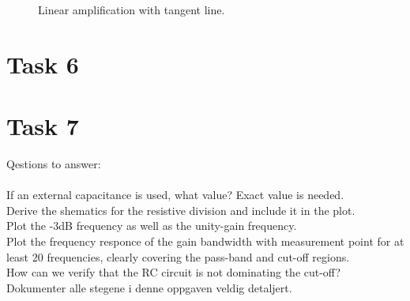 \documentclass[a4paper,english,11pt]{article}
\begin{document}
\begin{figure}[htbp]
 \centering
  \caption{Linear amplification with tangent line.}
  \label{fig:lin-amp-tan}	
\end{figure}

\section{Task 6}

\section{Task 7}
Qestions to answer:\\
\\
If an external capacitance is used, what value? Exact value is needed.\\
Derive the shematics for the resistive division and include it in the plot.\\
Plot the -3dB frequency as well as the unity-gain frequency.\\
Plot the frequency responce of the gain bandwidth with measurement point for at least 20 frequencies, clearly covering the pass-band and cut-off regions.\\
How can we verify that the RC circuit is not dominating the cut-off?\\
Dokumenter alle stegene i denne oppgaven veldig detaljert.\\
\end{document}
